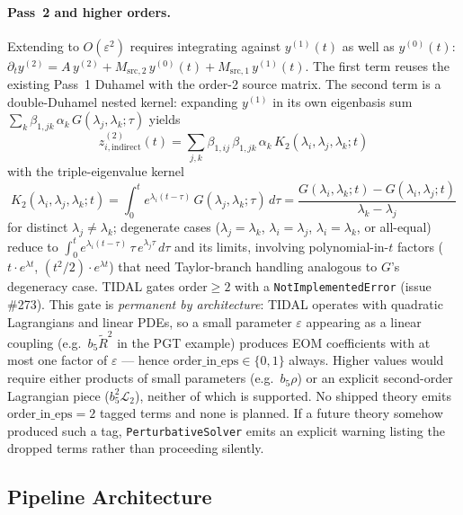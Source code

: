 \paragraph{Pass~2 and higher orders.} Extending to $O(\varepsilon^2)$ requires integrating against $y^{(1)}(t)$ as well as $y^{(0)}(t)$: $\partial_t y^{(2)} = A\,y^{(2)} + M_{\mathrm{src},2}\,y^{(0)}(t) + M_{\mathrm{src},1}\,y^{(1)}(t)$. The first term reuses the existing Pass~1 Duhamel with the order-2 source matrix. The second term is a double-Duhamel nested kernel: expanding $y^{(1)}$ in its own eigenbasis sum $\sum_k \beta_{1,jk}\,\alpha_k\,G(\lambda_j, \lambda_k; \tau)$ yields
\begin{equation}
  z^{(2)}_{i, \text{indirect}}(t) = \sum_{j,k} \beta_{1,ij}\,\beta_{1,jk}\,\alpha_k\, K_2(\lambda_i, \lambda_j, \lambda_k; t)
\end{equation}
with the triple-eigenvalue kernel
\begin{equation}
  K_2(\lambda_i, \lambda_j, \lambda_k; t) = \int_0^t e^{\lambda_i(t-\tau)}\,G(\lambda_j, \lambda_k; \tau)\,d\tau = \frac{G(\lambda_i, \lambda_k; t) - G(\lambda_i, \lambda_j; t)}{\lambda_k - \lambda_j}
\end{equation}
for distinct $\lambda_j \neq \lambda_k$; degenerate cases ($\lambda_j = \lambda_k$, $\lambda_i = \lambda_j$, $\lambda_i = \lambda_k$, or all-equal) reduce to $\int_0^t e^{\lambda_i(t-\tau)}\,\tau\,e^{\lambda_j\tau}\,d\tau$ and its limits, involving polynomial-in-$t$ factors ($t\cdot e^{\lambda t}$, $(t^2/2)\cdot e^{\lambda t}$) that need Taylor-branch handling analogous to $G$'s degeneracy case. TIDAL gates $\mathrm{order} \geq 2$ with a \verb|NotImplementedError| (issue \#273). This gate is \emph{permanent by architecture}: TIDAL operates with quadratic Lagrangians and linear PDEs, so a small parameter $\varepsilon$ appearing as a linear coupling (e.g.\ $b_5 \tilde{R}^2$ in the PGT example) produces EOM coefficients with at most one factor of $\varepsilon$ — hence $\mathrm{order\_in\_eps} \in \{0, 1\}$ always. Higher values would require either products of small parameters (e.g.\ $b_5 \rho$) or an explicit second-order Lagrangian piece ($b_5^2 \mathcal{L}_2$), neither of which is supported. No shipped theory emits $\mathrm{order\_in\_eps} = 2$ tagged terms and none is planned. If a future theory somehow produced such a tag, \verb|PerturbativeSolver| emits an explicit warning listing the dropped terms rather than proceeding silently.

\subsection{Pipeline Architecture}
\label{sec:pr-architecture}

